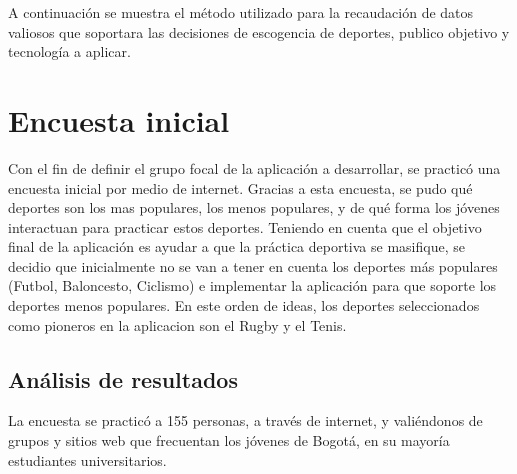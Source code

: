 A continuación se muestra el método utilizado para la recaudación de datos valiosos que soportara las decisiones de escogencia de deportes, publico objetivo y tecnología a aplicar.

\section{Encuesta inicial}

Con el fin de definir el grupo focal de la aplicación a desarrollar, se practicó una encuesta inicial por medio de internet. Gracias a esta encuesta, se pudo qué deportes son los mas populares, los menos populares, y de qué forma los jóvenes interactuan para practicar estos deportes. Teniendo en cuenta que el objetivo final de la aplicación es ayudar a que la práctica deportiva se masifique, se decidio que inicialmente no se van a tener en cuenta los deportes más populares (Futbol, Baloncesto, Ciclismo) e implementar la aplicación para que soporte los deportes menos populares. En este orden de ideas, los deportes seleccionados como pioneros en la aplicacion son el Rugby y el Tenis.

\subsection{Análisis de resultados}

La encuesta se practicó a 155 personas, a través de internet, y valiéndonos de grupos y sitios web que frecuentan los jóvenes de Bogotá, en su mayoría estudiantes universitarios.\\

